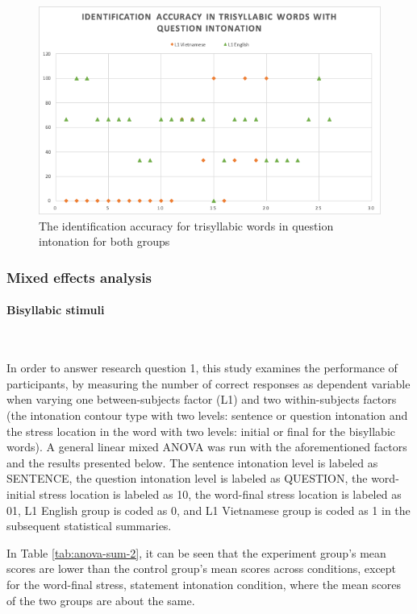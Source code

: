 \documentclass[a4paper]{article}
\begin{document}
\begin{figure}[H]
\begin{center}  
\includegraphics[scale=0.7]{identification-accuracy-tri-question.png} 
\caption{The identification accuracy for trisyllabic words in question intonation for both groups}
\label{fig:icq3}
\end{center}   
\end{figure}

\subsubsection{Mixed effects analysis}

\paragraph{Bisyllabic stimuli} \

In order to answer research question 1, this study examines the performance of participants, by measuring the number of correct responses as dependent variable when varying one between-subjects factor (L1) and two within-subjects factors (the intonation contour type with two levels: sentence or question intonation and the stress location in the word with two levels: initial or final for the bisyllabic words). A general linear mixed ANOVA was run with the aforementioned factors and the results presented below. The sentence intonation level is labeled as SENTENCE, the question intonation level is labeled as QUESTION, the word-initial stress location is labeled as 10, the word-final stress location is labeled as 01, L1 English group is coded as 0, and L1 Vietnamese group is coded as 1 in the subsequent statistical summaries.

In Table \ref{tab:anova-sum-2}, it can be seen that the experiment group's mean scores are lower than the control group's mean scores across conditions, except for the word-final stress, statement intonation condition, where the mean scores of the two groups are about the same.
\end{document}
